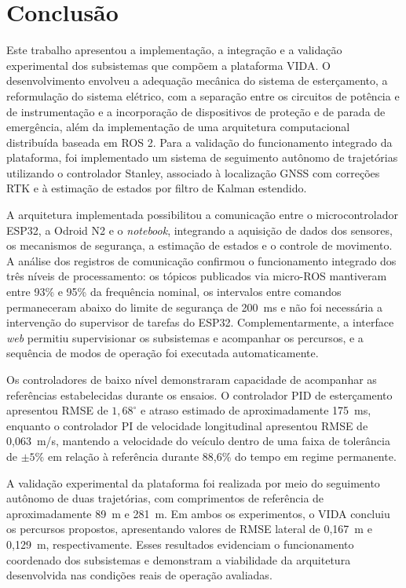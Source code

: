 \section{Conclusão}
\label{sec:conclusao}

Este trabalho apresentou a implementação, a integração e a validação experimental dos subsistemas que compõem a plataforma VIDA. O desenvolvimento envolveu a adequação mecânica do sistema de esterçamento, a reformulação do sistema elétrico, com a separação entre os circuitos de potência e de instrumentação e a incorporação de dispositivos de proteção e de parada de emergência, além da implementação de uma arquitetura computacional distribuída baseada em ROS 2. Para a validação do funcionamento integrado da plataforma, foi implementado um sistema de seguimento autônomo de trajetórias utilizando o controlador Stanley, associado à localização GNSS com correções RTK e à estimação de estados por filtro de Kalman estendido.

A arquitetura implementada possibilitou a comunicação entre o microcontrolador ESP32, a Odroid N2 e o \textit{notebook}, integrando a aquisição de dados dos sensores, os mecanismos de segurança, a estimação de estados e o controle de movimento. A análise dos registros de comunicação confirmou o funcionamento integrado dos três níveis de processamento: os tópicos publicados via micro-ROS mantiveram entre 93\% e 95\% da frequência nominal, os intervalos entre comandos permaneceram abaixo do limite de segurança de 200~ms e não foi necessária a intervenção do supervisor de tarefas do ESP32. Complementarmente, a interface \textit{web} permitiu supervisionar os subsistemas e acompanhar os percursos, e a sequência de modos de operação foi executada automaticamente.

Os controladores de baixo nível demonstraram capacidade de acompanhar as referências estabelecidas durante os ensaios. O controlador PID de esterçamento apresentou RMSE de $1{,}68^\circ$ e atraso estimado de aproximadamente 175~ms, enquanto o controlador PI de velocidade longitudinal apresentou RMSE de 0,063~m/s, mantendo a velocidade do veículo dentro de uma faixa de tolerância de $\pm 5\%$ em relação à referência durante 88,6\% do tempo em regime permanente.

A validação experimental da plataforma foi realizada por meio do seguimento autônomo de duas trajetórias, com comprimentos de referência de aproximadamente 89~m e 281~m. Em ambos os experimentos, o VIDA concluiu os percursos propostos, apresentando valores de RMSE lateral de 0,167~m e 0,129~m, respectivamente. Esses resultados evidenciam o funcionamento coordenado dos subsistemas e demonstram a viabilidade da arquitetura desenvolvida nas condições reais de operação avaliadas.

